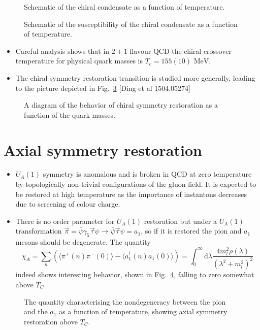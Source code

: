 \begin{figure}
\caption{Schematic of the chiral condensate as a function of temperature.\label{fig:chi_cond}
}
\end{figure}
\begin{figure}

\caption{Schematic of the susceptibility of the chiral condensate as a function of temperature.\label{fig:chi_sus}}
\end{figure}
\begin{itemize}
    \item Careful analysis shows that in $2 + 1$ flavour QCD the chiral crossover temperature for physical quark masses is $T_c = 155(10) \text{ MeV}$.
    \item The chiral symmetry restoration transition is studied more generally, leading to the picture depicted in Fig.~\ref{fig:chi_sym_rest} [Ding et al 1504.05274]
\end{itemize}
\begin{figure}
    \centering
    \caption{A diagram of the behavior of chiral symmetry restoration as a function of the quark masses.
    \label{fig:chi_sym_rest}}
\end{figure}

\section{Axial symmetry restoration}
\begin{itemize}
    \item $U_A(1)$ symmetry is anomalous and is broken in QCD at zero temperature by topologically non-trivial configurations of the gluon field. It is expected to be restored at high temperature as the importance of instantons decreases due to screening of colour charge.
        \item There is no order parameter for $U_A(1)$ restoration but under a $U_A(1)$ transformation $\vec{\pi} = \bar{\psi} \gamma_5 \vec{\tau} \psi \rightarrow \bar{\psi} \vec{\tau} \psi = a_1$, so if it is restored the pion and $a_1$ mesons should be degenerate. The quantity
\begin{equation}
    \chi_A = \sum_n (\langle \pi^+(n) \pi^-(0) \rangle - \langle a_1^\dagger(n) a_1(0) \rangle) = \int_0^\infty \text{d}\lambda \frac{4 m_l^2 \rho(\lambda)}{(\lambda^2 + m_l^2)^2}
\end{equation}
indeed shows interesting behavior, shown in Fig.~\ref{fig:asr}, falling to zero somewhat above $T_C$.
\end{itemize}
\begin{figure}
    \centering
    \caption{The quantity characterising the nondegeneracy between the pion and the $a_1$ as a function of temperature, showing axial symmetry restoration above $T_C$.
        \label{fig:asr}}
\end{figure}

